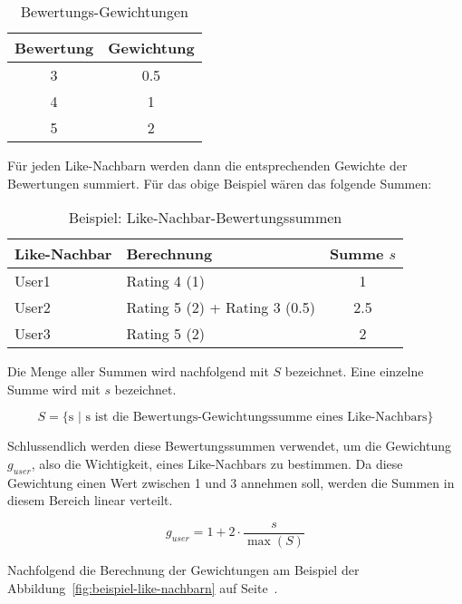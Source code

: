 \documentclass[10pt,a4paper]{scrartcl}
\begin{document}
\begin{table}[H]
	\begin{center}
		\begin{tabular}{cc}
			\toprule
			Bewertung & Gewichtung \\
			\midrule
			3 & 0.5 \\
			4 & 1 \\
			5 & 2 \\
			\bottomrule
		\end{tabular}
	\end{center}
	\caption{Bewertungs-Gewichtungen}
	\label{table:bewertungs-gewichtungen}
\end{table}

Für jeden Like-Nachbarn werden dann die entsprechenden Gewichte der Bewertungen summiert. Für
das obige Beispiel wären das folgende Summen:

\begin{table}[H]
	\begin{center}
		\begin{tabular}{llc}
			\toprule
			Like-Nachbar & Berechnung & Summe $s$ \\
			\midrule
			User1 & Rating 4 (1) & 1 \\
			User2 & Rating 5 (2) + Rating 3 (0.5) & 2.5 \\
			User3 & Rating 5 (2) & 2 \\
			\bottomrule
		\end{tabular}
	\end{center}
	\label{table:like-nachbar-bewertungssummen}
	\caption{Beispiel: Like-Nachbar-Bewertungssummen}
\end{table}

Die Menge aller Summen wird nachfolgend mit $S$ bezeichnet. Eine einzelne Summe wird mit $s$
bezeichnet.

$$S = \{ \textrm{s $|$ s ist die Bewertungs-Gewichtungssumme eines Like-Nachbars} \}$$

Schlussendlich werden diese Bewertungssummen verwendet, um die Gewichtung $g_{user}$, also die
Wichtigkeit, eines Like-Nachbars zu bestimmen. Da diese Gewichtung einen Wert zwischen 1 und 3 annehmen
soll, werden die Summen in diesem Bereich linear verteilt.

$$g_{user} = 1 + 2 \cdot \frac{s}{\max(S)}$$

Nachfolgend die Berechnung der Gewichtungen am Beispiel der Abbildung~\ref{fig:beispiel-like-nachbarn}
auf Seite~\pageref{fig:beispiel-like-nachbarn}.
\end{document}
